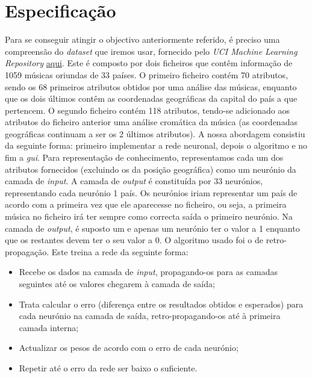 \documentclass[a4paper]{article}
\begin{document}
\section{Especificação}
Para se conseguir atingir o objectivo anteriormente referido, é preciso uma compreensão do \textit{dataset} que iremos usar, fornecido pelo \textit{UCI Machine Learning Repository} \href{http://tinyurl.com/qcxjzap}{aqui}. Este é composto por dois ficheiros que contêm informação de 1059 músicas oriundas de 33 países. O primeiro ficheiro contém 70 atributos, sendo os 68 primeiros atributos obtidos por uma análise das músicas, enquanto que os dois últimos contêm as coordenadas geográficas da capital do país a que pertencem. O segundo ficheiro contém 118 atributos, tendo-se adicionado aos atributos do ficheiro anterior uma análise cromática da música (as coordenadas geográficas continuam a ser os 2 últimos atributos). \linebreak
A nossa abordagem consistiu da seguinte forma: primeiro implementar a rede neuronal, depois o algoritmo e no fim a \textit{gui}. Para representação de conhecimento, representamos cada um dos atributos fornecidos (excluindo os da posição geográfica) como um neurónio da camada de \textit{input}. A camada de \textit{output} é constituída por 33 neurónios, representando cada neurónio 1 país. Os neurónios iriam representar um país de acordo com a primeira vez que ele aparecesse no ficheiro, ou seja, a primeira música no ficheiro irá ter sempre como correcta saída o primeiro neurónio. Na camada de \textit{output}, é suposto um e apenas um neurónio ter o valor a 1 enquanto que os restantes devem ter o seu valor a 0.\linebreak
O algoritmo usado foi o de retro-propagação. Este treina a rede da seguinte forma:

\begin{itemize}
\item Recebe os dados na camada de \textit{input}, propagando-os para as camadas seguintes até os valores chegarem à camada de saída;
\item  Trata calcular o erro (diferença entre os resultados obtidos e esperados) para cada neurónio na camada de saída, retro-propagando-os até à primeira camada interna;
\item Actualizar os pesos de acordo com o erro de cada neurónio;
\item Repetir até o erro da rede ser baixo o suficiente.
\end{itemize}
\end{document}
